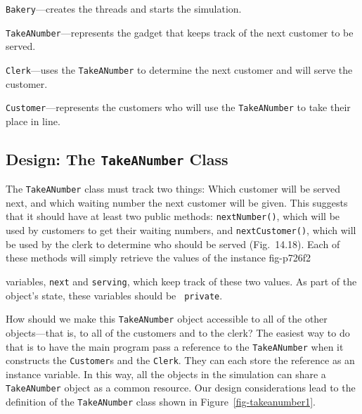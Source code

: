 \begin{BL}
\item  {\tt Bakery}---creates the threads and starts
the \mbox{simulation.}
\item  {\tt TakeANumber}---represents the gadget that keeps track of the
next customer to be served.
\item  {\tt Clerk}---uses the {\tt TakeANumber} to determine the
next customer and will serve the customer.
\item  {\tt Customer}---represents the customers who will use
the {\tt TakeANumber} to take their place in line.
\end{BL}


\subsection{Design: The {\tt TakeANumber} Class}
\noindent The {\tt TakeANumber} class must track two things: Which
customer will be served next, and which waiting number the next
customer will be given.  This suggests that it should have at least two
public methods: {\tt nextNumber()}, which will be used by customers to
get their waiting numbers, and {\tt nextCustomer()}, which will be used
by the clerk to determine who should be served (Fig.~14.18).
Each of these methods will simply retrieve the values of the instance
{fig-p726f2}

variables, {\tt next} and {\tt serving}, which keep track of these two
values.  As part of the object's state, these variables should be {\tt
private}.


How should we make this {\tt TakeANumber} object accessible to all of
the other objects---that is, to all of the customers and to the
clerk?  The easiest way to do that is to have the main program pass a
reference to the {\tt TakeANumber} when it constructs the
{\tt Customer}s and the {\tt Clerk}.  They can each store the reference as
an instance variable.   In this way, all the objects in the simulation
can share a {\tt TakeANumber} object as a common resource.
Our design considerations lead to the definition of
the {\tt TakeANumber} class shown in Figure~\ref{fig-takeanumber1}.


